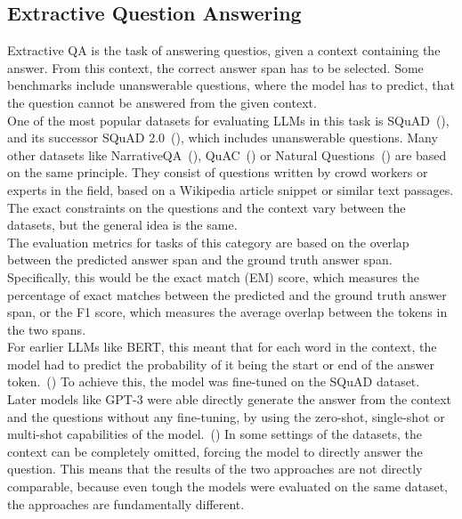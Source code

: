\subsection{Extractive Question Answering}\label{sec:extractive-qa}
Extractive QA is the task of answering questios, given a context containing the answer.
From this context, the correct answer span has to be selected.
Some benchmarks include unanswerable questions, where the model has to predict, that the question cannot be answered from the given context.
\\
One of the most popular datasets for evaluating LLMs in this task is SQuAD~(\cite{rajpurkar:2016}), and its successor SQuAD 2.0~(\cite{rajpurkar:2018}), which includes unanswerable questions.
Many other datasets like NarrativeQA~(\cite{kovcisky:2018}), QuAC~(\cite{choi:2018}) or Natural Questions~(\cite{kwiatkowski:2019}) are based on the same principle.
They consist of questions written by crowd workers or experts in the field, based on a Wikipedia article snippet or similar text passages.
The exact constraints on the questions and the context vary between the datasets, but the general idea is the same.
\\
The evaluation metrics for tasks of this category are based on the overlap between the predicted answer span and the ground truth answer span.
Specifically, this would be the exact match (EM) score, which measures the percentage of exact matches between the predicted and the ground truth answer span, or the F1 score, which measures the average overlap between the tokens in the two spans.
\\
For earlier LLMs like BERT, this meant that for each word in the context, the model had to predict the probability of it being the start or end of the answer token.~(\cite{devlin:2018})
To achieve this, the model was fine-tuned on the SQuAD dataset. 
\\
Later models like GPT-3 were able directly generate the answer from the context and the questions without any fine-tuning, by using the zero-shot, single-shot or multi-shot capabilities of the model.~(\cite{brown:2020})
In some settings of the datasets, the context can be completely omitted, forcing the model to directly answer the question.
This means that the results of the two approaches are not directly comparable, because even tough the models were evaluated on the same dataset, the approaches are fundamentally different.

